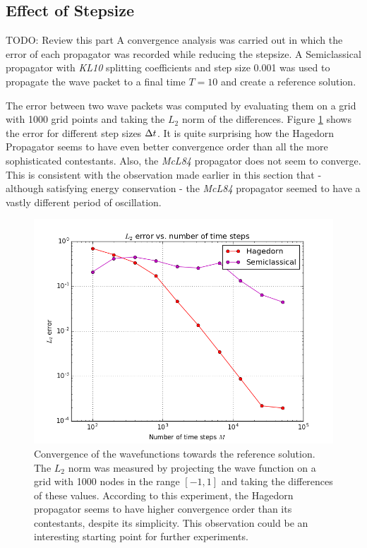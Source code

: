 \subsection{Effect of Stepsize}
\label{subsec:convergence}
{\Huge TODO: Review this part}
%
A convergence analysis was carried out in which the error of each propagator was recorded while reducing the stepsize.
A Semiclassical propagator with \emph{KL10} splitting coefficients and step size 0.001 was used to propagate the wave packet to a final time $T = 10$ and create a reference solution.
\par\medskip
%
The error between two wave packets was computed by evaluating them on a grid with 1000 grid points and taking the $L_2$ norm of the differences.
Figure \ref{fig:error_analysis} shows the error for different step sizes $\Delta t$.
It is quite surprising how the Hagedorn Propagator seems to have even better convergence order than all the more sophisticated contestants.
Also, the \emph{McL84} propagator does not seem to converge. This is consistent with the observation made earlier in this section that - although satisfying energy conservation - the \emph{McL84} propagator seemed to have a vastly different period of oscillation.

\begin{figure}[ht]
	\centering
	\includegraphics[width=.8\textwidth]{figures/error_analysis.png}
	\caption{Convergence of the wavefunctions towards the reference solution. The $L_2$ norm was measured by projecting the wave function on a grid with 1000 nodes in the range $[-1,1]$ and taking the differences of these values. According to this experiment, the Hagedorn propagator seems to have higher convergence order than its contestants, despite its simplicity.
	This observation could be an interesting starting point for further experiments.}
	\label{fig:error_analysis}
\end{figure}

